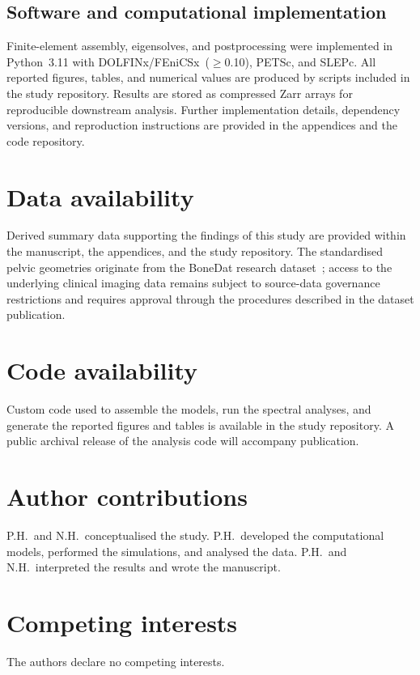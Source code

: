 \documentclass[11pt]{article}
\begin{document}
\subsection{Software and computational implementation}

Finite-element assembly, eigensolves, and postprocessing were implemented in Python~3.11 with DOLFINx/FEniCSx~($\ge$0.10), PETSc, and SLEPc.
All reported figures, tables, and numerical values are produced by scripts included in the study repository.
Results are stored as compressed Zarr arrays for reproducible downstream analysis.
Further implementation details, dependency versions, and reproduction instructions are provided in the appendices and the code repository.

\section*{Data availability}
Derived summary data supporting the findings of this study are provided within the manuscript, the appendices, and the study repository.
The standardised pelvic geometries originate from the BoneDat research dataset~\citep{HenyssKuchar2025BoneDat}; access to the underlying clinical imaging data remains subject to source-data governance restrictions and requires approval through the procedures described in the dataset publication.

\section*{Code availability}
Custom code used to assemble the models, run the spectral analyses, and generate the reported figures and tables is available in the study repository.
A public archival release of the analysis code will accompany publication.

\section*{Author contributions}
P.H.\ and N.H.\ conceptualised the study.
P.H.\ developed the computational models, performed the simulations, and analysed the data.
P.H.\ and N.H.\ interpreted the results and wrote the manuscript.

\section*{Competing interests}
The authors declare no competing interests.
\end{document}
